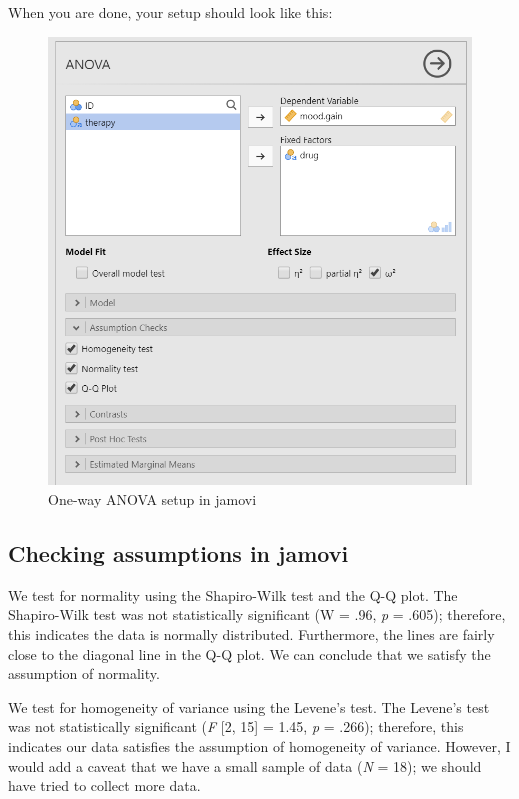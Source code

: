 \documentclass[
]{book}
\begin{document}
When you are done, your setup should look like this:

\begin{figure}

{\centering \includegraphics[width=0.8\linewidth]{images/04_one-way-anova/one-way_setup} 

}

\caption{One-way ANOVA setup in jamovi}\label{fig:unnamed-chunk-3}
\end{figure}

\hypertarget{checking-assumptions-in-jamovi-2}{%
\subsection{Checking assumptions in jamovi}\label{checking-assumptions-in-jamovi-2}}

We test for normality using the Shapiro-Wilk test and the Q-Q plot. The Shapiro-Wilk test was not statistically significant (W = .96, \emph{p} = .605); therefore, this indicates the data is normally distributed. Furthermore, the lines are fairly close to the diagonal line in the Q-Q plot. We can conclude that we satisfy the assumption of normality.

We test for homogeneity of variance using the Levene's test. The Levene's test was not statistically significant (\emph{F} {[}2, 15{]} = 1.45, \emph{p} = .266); therefore, this indicates our data satisfies the assumption of homogeneity of variance. However, I would add a caveat that we have a small sample of data (\emph{N} = 18); we should have tried to collect more data.
\end{document}
